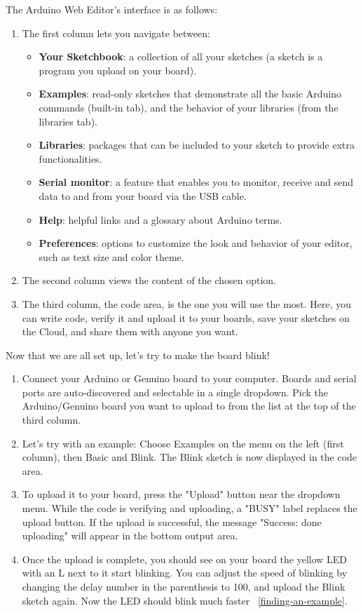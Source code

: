 The Arduino Web Editor's interface is as follows: 
\begin{enumerate}
	\item The first column lets you navigate between:
	\begin{itemize}
		\item \textbf{Your Sketchbook}: a collection of all your sketches (a sketch is a program you upload on your board).
		\item \textbf{Examples}: read-only sketches that demonstrate all the basic Arduino commands (built-in tab), and the behavior of your libraries (from the libraries tab).
		\item \textbf{Libraries}: packages that can be included to your sketch to provide extra functionalities.
		\item \textbf{Serial monitor}: a feature that enables you to monitor, receive and send data to and from your board via the USB cable.
		\item \textbf{Help}: helpful links and a glossary about Arduino terms.
		\item \textbf{Preferences}: options to customize the look and behavior of your editor, such as text size and color theme.		
	\end{itemize}
	\item The second column views the content of the chosen option.
	\item The third column, the code area, is the one you will use the most. Here, you can write code, verify it and upload it to your boards, save your sketches on the Cloud, and share them with anyone you want.
\end{enumerate}

Now that we are all set up, let’s try to make the board blink!

\begin{enumerate}
	\item Connect your Arduino or Genuino board to your computer. Boards and serial ports are auto-discovered and selectable in a single dropdown. Pick the Arduino/Genuino board you want to upload to from the list at the top of the third column.\cite{arduinoWebEditor:2024}
	\item Let’s try with an example: Choose Examples on the menu on the left (first column), then Basic and Blink. The Blink sketch is now displayed in the code area. 
	\item To upload it to your board, press the "Upload" button near the dropdown menu. While the code is verifying and uploading, a "BUSY" label replaces the upload button. If the upload is successful, the message "Success: done uploading" will appear in the bottom output area.
	\item Once the upload is complete, you should see on your board the yellow LED with an L next to it start blinking. You can adjust the speed of blinking by changing the delay number in the parenthesis to 100, and upload the Blink sketch again. Now the LED should blink much faster ~\ref{finding-an-example}.
\end{enumerate}


